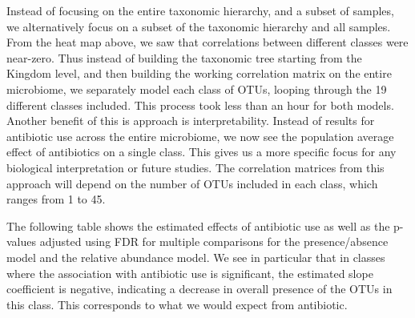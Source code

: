 \documentclass[12pt]{article}
\begin{document}
Instead of focusing on the entire taxonomic hierarchy, and a subset of samples, we alternatively focus on a subset of the taxonomic hierarchy and all samples. From the heat map above, we saw that correlations between different classes were near-zero. Thus instead of building the taxonomic tree starting from the Kingdom level, and then building the working correlation matrix on the entire microbiome, we separately model each class of OTUs, looping through the 19 different classes included. This process took less than an hour for both models. Another benefit of this is approach is interpretability. Instead of results for antibiotic use across the entire microbiome, we now see the population average effect of antibiotics on a single class. This gives us a more specific focus for any biological interpretation or future studies. The correlation matrices from this approach will depend on the number of OTUs included in each class, which ranges from 1 to 45.

The following table shows the estimated effects of antibiotic use as well as the p-values adjusted using FDR for multiple comparisons for the presence/absence model and the relative abundance model. We see in particular that in classes where the association with antibiotic use is significant, the estimated slope coefficient is negative, indicating a decrease in overall presence of the OTUs in this class. This corresponds to what we would expect from antibiotic.
\end{document}
